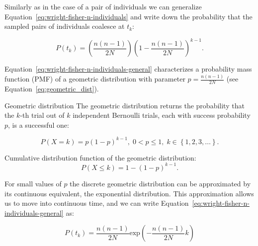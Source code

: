 \noindent
Similarly as in the case of a pair of individuals we can generalize Equation~\ref{eq:wright-fisher-n-individuals} and write down the probability that the sampled pairs of individuals coalesce at $t_{k}$:

\begin{equation}
P\left(t_{k}\right)=\left(\frac{n\left(n-1\right)}{2N}\right)\left(1-\frac{n\left(n-1\right)}{2N}\right)^{k-1}.
\label{eq:wright-fisher-n-individuals-general}
\end{equation}

\noindent
Equation~\ref{eq:wright-fisher-n-individuals-general} characterizes a probability mass function (PMF) of a geometric distribution with parameter $p=\frac{n\left(n-1\right)}{2N}$ (see Equation~\ref{eq:geometric_dist}).

\begin{remark}{Geometric distribution}
The geometric distribution returns the probability that the $k$-th trial out of $k$ independent Bernoulli trials, each with success probability $p$, is a successful one:

\begin{equation}
P\left(X=k\right)=p\left(1-p\right)^{k-1},\;0<p\leq1,\; k\in\left\{ 1,2,3,\ldots\right\}.
\label{eq:geometric_dist}
\end{equation}

\noindent
Cumulative distribution function of the geometric distribution:
\begin{equation}
P(X\leq k)=1-\left(1-p\right)^{k-1}.
\label{eq:geometric_cdf}
\end{equation}
\end{remark}

For small values of $p$ the discrete geometric distribution can be approximated by its continuous equivalent, the exponential distribution. 
%
%
This approximation allows us to move into continuous time, and we can write Equation~\ref{eq:wright-fisher-n-individuals-general} as:

\begin{equation}
P\left(t_{k}\right)=\frac{n\left(n-1\right)}{2N}\textrm{exp}\left(-\frac{n\left(n-1\right)}{2N}k\right)
\label{eq:exponential_time}
\end{equation}

